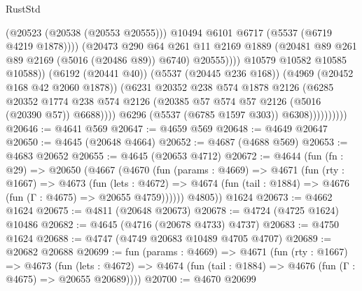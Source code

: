 \begin{lexlean}{RustStd}
\begin{coremodule}
                                        (@20523 (@20538 (@20553 @20555)))
                                        @10494
                                        @6101
                                        @6717
                                        (@5537 (@6719 @4219 @1878))))
                                    (@20473
                                      @290
                                      @64
                                      @261
                                      @11
                                      @2169
                                      @1889
                                      (@20481 @89 @261 @89 @2169 (@5016 (@20486 @89)) @6740)
                                      @20555))))
                              @10579
                              @10582
                              @10585
                              @10588))
                          (@6192 (@20441 @40))
                          (@5537 (@20445 @236 @168))
                          (@4969 (@20452 @168 @42 @2060 @1878))
                          (@6231
                            @20352
                            @238
                            @574
                            @1878
                            @2126
                            (@6285
                              @20352
                              @1774
                              @238
                              @574
                              @2126
                              (@20385 @57 @574 @57 @2126 (@5016 (@20390 @57)) @6688))))
                        @6296
                        (@5537 (@6785 @1597 @303))
                        @6308))))))))))
@20646 := @4641 @569
@20647 := @4659 @569
@20648 := @4649 @20647
@20650 := @4645 (@20648 @4664)
@20652 := @4687 (@4688 @569)
@20653 := @4683 @20652
@20655 := @4645 (@20653 @4712)
@20672 := @4644
    (fun (fn : @29) =>
    @20650
      (@4667
        (@4670
          (fun (params : @4669) =>
          @4671
            (fun (rty : @1667) =>
            @4673
              (fun (lets : @4672) =>
              @4674 (fun (tail : @1884) => @4676 (fun (Γ : @4675) => @20655 @4759))))))
        @4805))
    @1624
@20673 := @4662 @1624
@20675 := @4811 (@20648 @20673)
@20678 := @4724 (@4725 @1624) @10486
@20682 := @4645 (@4716 (@20678 @4733) @4737)
@20683 := @4750 @1624
@20688 := @4747 (@4749 @20683 @10489 @4705 @4707)
@20689 := @20682 @20688
@20699 := fun (params : @4669) =>
  @4671
    (fun (rty : @1667) =>
    @4673
      (fun (lets : @4672) =>
      @4674 (fun (tail : @1884) => @4676 (fun (Γ : @4675) => @20655 @20689))))
@20700 := @4670 @20699

\end{coremodule}
\end{lexlean}
